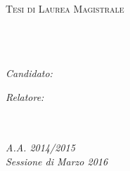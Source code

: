 \documentclass[
12pt, %
english, %
onehalfspacing, %
nolistspacing, %
toctotoc, %
parskip, %
]{MastersDoctoralThesis} %
\author{Marco \textsc{Rizzoli}} %
\begin{document}

\pagestyle{plain} %


\begin{titlepage}
\begin{center}

\textsc{\LARGE \univname}\\[1.5cm] %
\textsc{\Large Tesi di Laurea Magistrale}\\[0.5cm] %

\HRule \\[0.4cm] %
{\huge \bfseries \ttitle}\\[0.5cm] %
\HRule \\[1.5cm] %
 
\begin{minipage}{0.4\textwidth}
\begin{flushleft} \large
\emph{Candidato:}\\
\href{http://www.rizzoli.me.uk}{\authorname} %
\end{flushleft}
\end{minipage}
\begin{minipage}{0.4\textwidth}
\begin{flushright} \large
\emph{Relatore:} \\
\href{http://www.rizzoli.me.uk}{\supname} %
\end{flushright}
\end{minipage}\\[3cm]
 
\large \textit{\Large \deptname}\\[1cm] %
\textit{A.A. 2014/2015\\ Sessione di Marzo 2016}\\[0.3cm]

 
\vfill
\end{center}
\end{titlepage}
\end{document}
